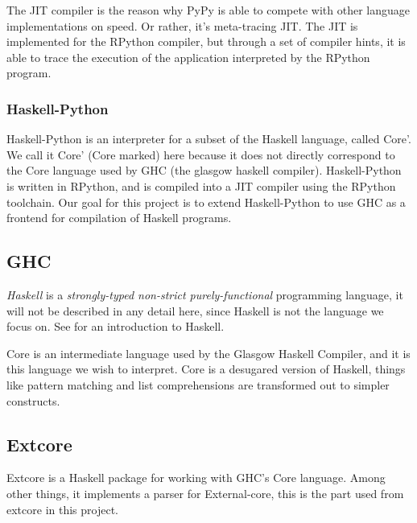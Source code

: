 The JIT compiler is the reason why PyPy is able to compete with other language implementations
on speed. Or rather, it's meta-tracing JIT. The JIT is implemented
for the RPython compiler, but through a set of compiler hints, it is able to trace the 
execution of the application interpreted by the RPython program.

\subsubsection{Haskell-Python}

Haskell-Python is an interpreter for a subset of the Haskell language, called Core'.
We call it Core' (Core marked) here because it does not directly correspond to 
the Core language
used by GHC (the glasgow haskell compiler). Haskell-Python is written in RPython,
and is compiled into a JIT compiler using the RPython toolchain. Our goal for this
project is to extend Haskell-Python to use GHC as a frontend for compilation 
of Haskell programs.

\subsection{GHC}

\emph{Haskell} is a \emph{strongly-typed non-strict purely-functional} 
programming language, it will not be described in any detail here, since 
Haskell is not the language we focus on. See \cite{hudak1992report}
for an introduction to Haskell. 

Core is an intermediate language used by the Glasgow Haskell Compiler\cite{ghc},
and it is this language we wish to interpret. Core is a desugared version of Haskell, 
things like pattern matching
and list comprehensions are transformed out to simpler constructs.\cite{jones1994compilation}

\subsection{Extcore}

Extcore is a Haskell package for working with GHC's Core language. Among other things,
it implements a parser for External-core, this is the part used from extcore in this project.

